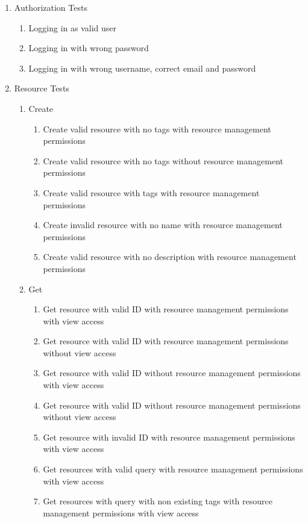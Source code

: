 \documentclass[12pt]{article}
\begin{document}
\begin{enumerate}
    \item Authorization Tests
    \begin{enumerate}
        \item Logging in as valid user
        \item Logging in with wrong password
        \item Logging in with wrong username, correct email and password
    \end{enumerate}
    \item Resource Tests
    \begin{enumerate}
        \item Create
        \begin{enumerate}
            \item Create valid resource with no tags with resource management permissions
            \item Create valid resource with no tags without resource management permissions
            \item Create valid resource with tags with resource management permissions
            \item Create invalid resource with no name with resource management permissions
            \item Create valid resource with no description with resource management permissions
        \end{enumerate}
        \item Get
        \begin{enumerate}
            \item Get resource with valid ID with resource management permissions with view access
            \item Get resource with valid ID with resource management permissions without view access
            \item Get resource with valid ID without resource management permissions with view access
            \item Get resource with valid ID without resource management permissions without view access
            \item Get resource with invalid ID with resource management permissions with view access
            \item Get resources with valid query with resource management permissions with view access
            \item Get resources with query with non existing tags with resource management permissions with view access    

\end{enumerate}
\end{enumerate}
\end{enumerate}
\end{document}
